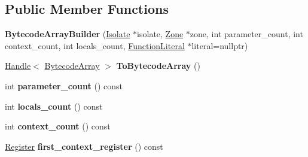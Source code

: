 \subsection*{Public Member Functions}
\begin{DoxyCompactItemize}
\item 
{\bfseries Bytecode\+Array\+Builder} (\hyperlink{classv8_1_1internal_1_1_isolate}{Isolate} $\ast$isolate, \hyperlink{classv8_1_1internal_1_1_zone}{Zone} $\ast$zone, int parameter\+\_\+count, int context\+\_\+count, int locals\+\_\+count, \hyperlink{classv8_1_1internal_1_1_function_literal}{Function\+Literal} $\ast$literal=nullptr)\hypertarget{classv8_1_1internal_1_1interpreter_1_1_bytecode_array_builder_a579f832bf14939632b6ad9aa2db62dfa}{}\label{classv8_1_1internal_1_1interpreter_1_1_bytecode_array_builder_a579f832bf14939632b6ad9aa2db62dfa}

\item 
\hyperlink{classv8_1_1internal_1_1_handle}{Handle}$<$ \hyperlink{classv8_1_1internal_1_1_bytecode_array}{Bytecode\+Array} $>$ {\bfseries To\+Bytecode\+Array} ()\hypertarget{classv8_1_1internal_1_1interpreter_1_1_bytecode_array_builder_a99d2a305738132cdeed0ac64a22f697e}{}\label{classv8_1_1internal_1_1interpreter_1_1_bytecode_array_builder_a99d2a305738132cdeed0ac64a22f697e}

\item 
int {\bfseries parameter\+\_\+count} () const \hypertarget{classv8_1_1internal_1_1interpreter_1_1_bytecode_array_builder_ad059f72150db93f27b4aac16c751cdff}{}\label{classv8_1_1internal_1_1interpreter_1_1_bytecode_array_builder_ad059f72150db93f27b4aac16c751cdff}

\item 
int {\bfseries locals\+\_\+count} () const \hypertarget{classv8_1_1internal_1_1interpreter_1_1_bytecode_array_builder_ad442176e43ef84198cd4791ddcd68c5b}{}\label{classv8_1_1internal_1_1interpreter_1_1_bytecode_array_builder_ad442176e43ef84198cd4791ddcd68c5b}

\item 
int {\bfseries context\+\_\+count} () const \hypertarget{classv8_1_1internal_1_1interpreter_1_1_bytecode_array_builder_a9db25b6bb1c0247045df7e930fdaa1a0}{}\label{classv8_1_1internal_1_1interpreter_1_1_bytecode_array_builder_a9db25b6bb1c0247045df7e930fdaa1a0}

\item 
\hyperlink{classv8_1_1internal_1_1interpreter_1_1_register}{Register} {\bfseries first\+\_\+context\+\_\+register} () const \hypertarget{classv8_1_1internal_1_1interpreter_1_1_bytecode_array_builder_a014d804bd9878c6569f5e0a183c4c592}{}\label{classv8_1_1internal_1_1interpreter_1_1_bytecode_array_builder_a014d804bd9878c6569f5e0a183c4c592}


\end{DoxyCompactItemize}
